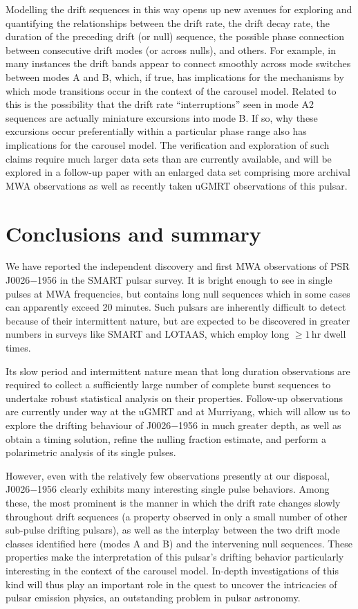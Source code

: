 \documentclass[twocolumn]{aastex631}
\newcommand{\psr}{J0026$-$1956}
\begin{document}
Modelling the drift sequences in this way opens up new avenues for exploring and quantifying the relationships between the drift rate, the drift decay rate, the duration of the preceding drift (or null) sequence, the possible phase connection between consecutive drift modes (or across nulls), and others.
For example, in many instances the drift bands appear to connect smoothly across mode switches between modes A and B, which, if true, has implications for the mechanisms by which mode transitions occur in the context of the carousel model.
Related to this is the possibility that the drift rate ``interruptions'' seen in mode A2 sequences are actually miniature excursions into mode B.
If so, why these excursions occur preferentially within a particular phase range also has implications for the carousel model.
The verification and exploration of such claims require much larger data sets than are currently available, and will be explored in a follow-up paper with an enlarged data set comprising more archival MWA observations as well as recently taken uGMRT observations of this pulsar.

\section{Conclusions and summary}
\label{sec:conclusions}

We have reported the independent discovery and first MWA observations of PSR \psr{} in the SMART pulsar survey.
It is bright enough to see in single pulses at MWA frequencies, but contains long null sequences which in some cases can apparently exceed 20 minutes.
Such pulsars are inherently difficult to detect because of their intermittent nature, but are expected to be discovered in greater numbers in surveys like SMART and LOTAAS, which employ long $\ge 1\,$hr dwell times.

Its slow period and intermittent nature mean that long duration observations are required to collect a sufficiently large number of complete burst sequences to undertake robust statistical analysis on their properties.
Follow-up observations are currently under way at the uGMRT and at Murriyang, which will allow us to explore the drifting behaviour of \psr{} in much greater depth, as well as obtain a timing solution, refine the nulling fraction estimate, and perform a polarimetric analysis of its single pulses.

However, even with the relatively few observations presently at our disposal, \psr{} clearly exhibits many interesting single pulse behaviors.
Among these, the most prominent is the manner in which the drift rate changes slowly throughout drift sequences (a property observed in only a small number of other sub-pulse drifting pulsars), as well as the interplay between the two drift mode classes identified here (modes A and B) and the intervening null sequences.
These properties make the interpretation of this pulsar's drifting behavior particularly interesting in the context of the carousel model.
In-depth investigations of this kind will thus play an important role in the quest to uncover the intricacies of pulsar emission physics, an outstanding problem in pulsar astronomy.
\end{document}
